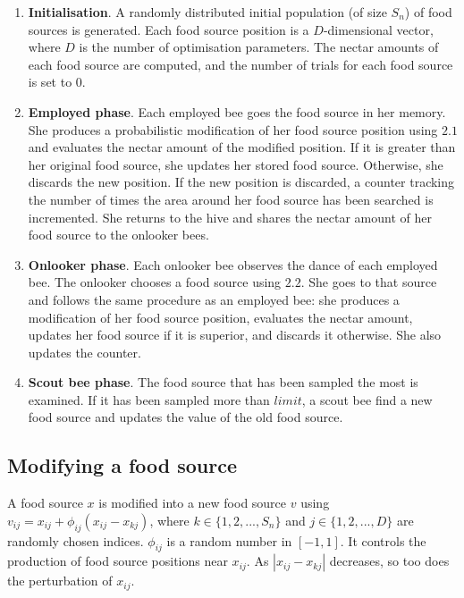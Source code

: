 \documentclass{article}
\begin{document}
\begin{enumerate}

	\item{\textbf{Initialisation}. A randomly distributed initial population (of size $S_n$) of food sources is generated. Each food source position is a $D$-dimensional vector, where $D$ is the number of optimisation parameters. The nectar amounts of each food source are computed, and the number of trials for each food source is set to $0$.}

	\item{\textbf{Employed phase}. Each employed bee goes the food source in her memory. She produces a probabilistic modification of her food source position using $2.1$ and evaluates the nectar amount of the modified position. If it is greater than her original food source, she updates her stored food source. Otherwise, she discards the new position. If the new position is discarded, a counter tracking the number of times the area around her food source has been searched is incremented. She returns to the hive and shares the nectar amount of her food source to the onlooker bees.}

	\item{\textbf{Onlooker phase}. Each onlooker bee observes the dance of each employed bee. The onlooker chooses a food source using $2.2$. She goes to that source and follows the same procedure as an employed bee: she produces a modification of her food source position, evaluates the nectar amount, updates her food source if it is superior, and discards it otherwise. She also updates the counter.}

	\item{\textbf{Scout bee phase}. The food source that has been sampled the most is examined. If it has been sampled more than $limit$, a scout bee find a new food source and updates the value of the old food source.}

\end{enumerate}

\subsection{Modifying a food source}

A food source $x$ is modified into a new food source $v$ using $v_{ij} = x_{ij} + \phi_{ij}(x_{ij} - x_{kj})$, where $k \in \{1, 2, ..., S_n \}$ and $j \in \{1, 2, ..., D\}$ are randomly chosen indices. $\phi_{ij}$ is a random number in $[-1, 1]$. It controls the production of food source positions near $x_{ij}$. As $|x_{ij} - x_{kj}|$ decreases, so too does the perturbation of $x_{ij}$.
\end{document}
